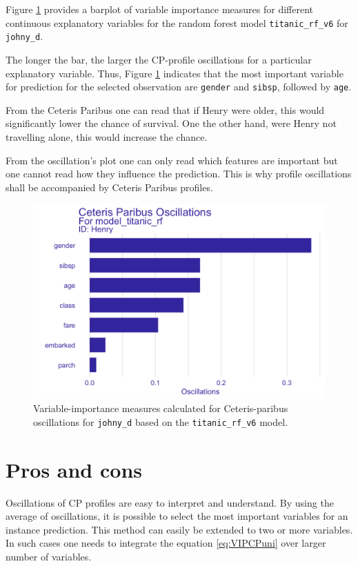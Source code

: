 \documentclass[]{krantz}
\begin{document}
Figure \ref{fig:CPVIP1} provides a barplot of variable importance measures for different continuous explanatory variables for the random forest model \texttt{titanic\_rf\_v6} for \texttt{johny\_d}.

The longer the bar, the larger the CP-profile oscillations for a particular explanatory variable. Thus, Figure \ref{fig:CPVIP1} indicates that the most important variable for prediction for the selected observation are \texttt{gender} and \texttt{sibsp}, followed by \texttt{age}.

From the Ceteris Paribus one can read that if Henry were older, this would significantly lower the chance of survival. One the other hand, were Henry not travelling alone, this would increase the chance.

From the oscillation's plot one can only read which features are important but one cannot read how they influence the prediction. This is why profile oscillations shall be accompanied by Ceteris Paribus profiles.



\begin{figure}

{\centering \includegraphics[width=0.65\linewidth]{figure/oscillations_all_rf_plot} 

}

\caption{Variable-importance measures calculated for Ceteris-paribus oscillations for \texttt{johny\_d} based on the \texttt{titanic\_rf\_v6} model.}\label{fig:CPVIP1}
\end{figure}

\hypertarget{CPOscProsCons}{%
\section{Pros and cons}\label{CPOscProsCons}}

Oscillations of CP profiles are easy to interpret and understand. By using the average of oscillations, it is possible to select the most important variables for an instance prediction. This method can easily be extended to two or more variables. In such cases one needs to integrate the equation \eqref{eq:VIPCPuni} over larger number of variables.
\end{document}
